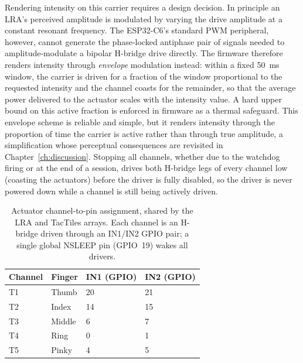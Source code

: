 \documentclass[12pt, a4paper]{report}
\begin{document}
Rendering intensity on this carrier requires a design decision. In principle an LRA's perceived amplitude is modulated by varying the drive amplitude at a constant resonant frequency. The ESP32-C6's standard PWM peripheral, however, cannot generate the phase-locked antiphase pair of signals needed to amplitude-modulate a bipolar H-bridge drive directly. The firmware therefore renders intensity through \emph{envelope} modulation instead: within a fixed 50~ms window, the carrier is driven for a fraction of the window proportional to the requested intensity and the channel coasts for the remainder, so that the average power delivered to the actuator scales with the intensity value. A hard upper bound on this active fraction is enforced in firmware as a thermal safeguard. This envelope scheme is reliable and simple, but it renders intensity through the proportion of time the carrier is active rather than through true amplitude, a simplification whose perceptual consequences are revisited in Chapter~\ref{ch:discussion}. Stopping all channels, whether due to the watchdog firing or at the end of a session, drives both H-bridge legs of every channel low (coasting the actuators) before the driver is fully disabled, so the driver is never powered down while a channel is still being actively driven.

\begin{table}[H]
    \centering
    \caption{Actuator channel-to-pin assignment, shared by the LRA and TacTiles arrays. Each channel is an H-bridge driven through an IN1/IN2 GPIO pair; a single global NSLEEP pin (GPIO~19) wakes all drivers.}
    \label{tab:pins}
    \begin{tabular}{@{}llll@{}}
        \toprule
        Channel & Finger & IN1 (GPIO) & IN2 (GPIO) \\
        \midrule
        T1      & Thumb  & 20         & 21         \\
        T2      & Index  & 14         & 15         \\
        T3      & Middle & 6          & 7          \\
        T4      & Ring   & 0          & 1          \\
        T5      & Pinky  & 4          & 5          \\
        \bottomrule
    \end{tabular}
\end{table}
\end{document}
